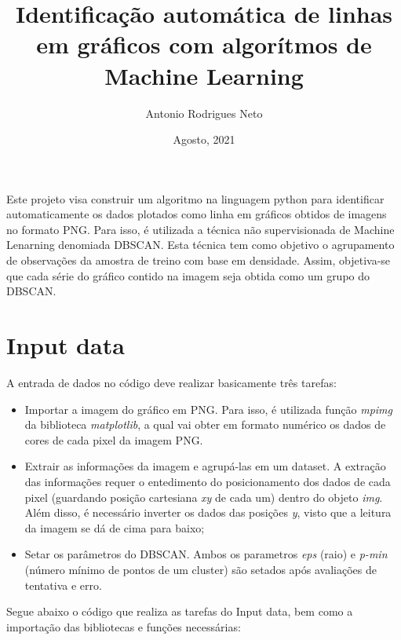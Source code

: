 \documentclass{article}
\title{Identificação automática de linhas em gráficos com algorítmos de Machine Learning}
\author{Antonio Rodrigues Neto}
\date{Agosto, 2021}
\begin{document}
    \maketitle
    
    
    Este projeto visa construir um algoritmo na linguagem python para identificar automaticamente os dados plotados como linha em gráficos obtidos de imagens no formato PNG. Para isso, é utilizada a técnica não supervisionada de Machine Lenarning denomiada DBSCAN. Esta técnica tem como objetivo o agrupamento de observações da amostra de treino com base em densidade. Assim, objetiva-se que cada série do gráfico contido na imagem seja obtida como um grupo do DBSCAN.
    
    \section{Input data}
    
    A entrada de dados no código deve realizar basicamente três tarefas:
    
    \begin{itemize}
        \item Importar a imagem do gráfico em PNG. Para isso, é utilizada função \textit{mpimg} da biblioteca \textit{matplotlib}, a qual vai obter em formato numérico os dados de cores de cada pixel da imagem PNG.
        
        \item Extrair as informações da imagem e agrupá-las em um dataset. A extração das informações requer o entedimento do posicionamento dos dados de cada pixel (guardando posição cartesiana \textit{xy} de cada um) dentro do objeto \textit{img}. Além disso, é necessário inverter os dados das posições \textit{y}, visto que a leitura da imagem se dá de cima para baixo;
        
        \item Setar os parâmetros do DBSCAN. Ambos os parametros \textit{eps} (raio) e \textit{p-min} (número mínimo de pontos de um cluster) são setados após avaliações de tentativa e erro.
    \end{itemize}
    
    Segue abaixo o código que realiza as tarefas do Input data, bem como a importação das bibliotecas e funções necessárias:
    
\end{document}
